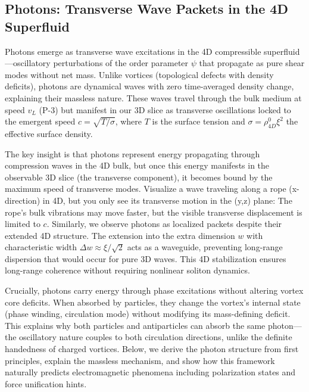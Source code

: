 \subsection{Photons: Transverse Wave Packets in the 4D Superfluid}

Photons emerge as transverse wave excitations in the 4D compressible superfluid---oscillatory perturbations of the order parameter $\psi$ that propagate as pure shear modes without net mass. Unlike vortices (topological defects with density deficits), photons are dynamical waves with zero time-averaged density change, explaining their massless nature. These waves travel through the bulk medium at speed $v_L$ (P-3) but manifest in our 3D slice as transverse oscillations locked to the emergent speed $c = \sqrt{T/\sigma}$, where $T$ is the surface tension and $\sigma = \rho_{4D}^0 \xi^2$ the effective surface density.

The key insight is that photons represent energy propagating through compression waves in the 4D bulk, but once this energy manifests in the observable 3D slice (the transverse component), it becomes bound by the maximum speed of transverse modes. Visualize a wave traveling along a rope (x-direction) in 4D, but you only see its transverse motion in the (y,z) plane: The rope's bulk vibrations may move faster, but the visible transverse displacement is limited to $c$. Similarly, we observe photons as localized packets despite their extended 4D structure. The extension into the extra dimension $w$ with characteristic width $\Delta w \approx \xi/\sqrt{2}$ acts as a waveguide, preventing long-range dispersion that would occur for pure 3D waves. This 4D stabilization ensures long-range coherence without requiring nonlinear soliton dynamics.

Crucially, photons carry energy through phase excitations without altering vortex core deficits. When absorbed by particles, they change the vortex's internal state (phase winding, circulation mode) without modifying its mass-defining deficit. This explains why both particles and antiparticles can absorb the same photon---the oscillatory nature couples to both circulation directions, unlike the definite handedness of charged vortices. Below, we derive the photon structure from first principles, explain the massless mechanism, and show how this framework naturally predicts electromagnetic phenomena including polarization states and force unification hints.

